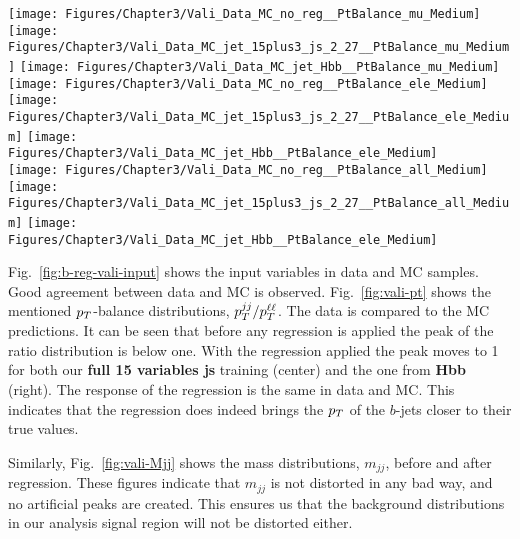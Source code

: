 \begin{figure*}[thb]
  \centering
  \texttt{[image: Figures/Chapter3/Vali\_Data\_MC\_no\_reg\_\_PtBalance\_mu\_Medium]}\hfil
  \texttt{[image: Figures/Chapter3/Vali\_Data\_MC\_jet\_15plus3\_js\_2\_27\_\_PtBalance\_mu\_Medium]}\hfil
  \texttt{[image: Figures/Chapter3/Vali\_Data\_MC\_jet\_Hbb\_\_PtBalance\_mu\_Medium]}\hfil\\
  \texttt{[image: Figures/Chapter3/Vali\_Data\_MC\_no\_reg\_\_PtBalance\_ele\_Medium]}\hfil
  \texttt{[image: Figures/Chapter3/Vali\_Data\_MC\_jet\_15plus3\_js\_2\_27\_\_PtBalance\_ele\_Medium]}\hfil
  \texttt{[image: Figures/Chapter3/Vali\_Data\_MC\_jet\_Hbb\_\_PtBalance\_ele\_Medium]}\hfil\\
  \texttt{[image: Figures/Chapter3/Vali\_Data\_MC\_no\_reg\_\_PtBalance\_all\_Medium]}\hfil
  \texttt{[image: Figures/Chapter3/Vali\_Data\_MC\_jet\_15plus3\_js\_2\_27\_\_PtBalance\_all\_Medium]}\hfil
  \texttt{[image: Figures/Chapter3/Vali\_Data\_MC\_jet\_Hbb\_\_PtBalance\_ele\_Medium]}\hfil\\
  \caption{Pt balance (ratio) of the di-jet and di-lepton. On the left
    are the distributions without regression, in the center - using
    \textbf{full 15+3var js} training and on the right - using
    \textbf{Hbb} regression.  Top plots are for muon channel, middle
    for electron channel and bottom is the combination (sum) of the
    two.}
  \label{fig:vali-pt}
\end{figure*}


Fig.~\ref{fig:b-reg-vali-input} shows the input variables in data and MC samples.
Good agreement between data and MC is observed.
Fig.~\ref{fig:vali-pt} shows the mentioned $p_{T}$-balance distributions, $p_{T}^{jj}/p_{T}^{\ell\ell}$.
The data is compared to the MC predictions.
It can be seen that before any regression is applied the peak of the ratio distribution is below one.
With the regression applied the peak moves to 1 for both our \textbf{full 15 variables js} training (center) and the one from \textbf{Hbb} (right). 
The response of the regression is the same in data and MC.
This indicates that the regression does indeed brings the $p_{T}$ of the $b$-jets closer to their true values.

Similarly, Fig.~\ref{fig:vali-Mjj} shows the mass distributions, $m_{jj}$, before and after regression.
These figures indicate that $m_{jj}$ is not distorted in any bad way, and no artificial peaks are created.
This ensures us that the background distributions in our analysis signal region will not be distorted either.


